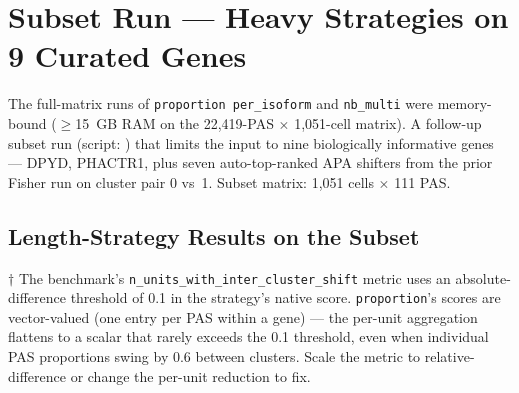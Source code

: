 \documentclass[11pt,a4paper]{article}
\begin{document}
\section{Subset Run --- Heavy Strategies on 9 Curated Genes}
\label{sec:subset_run}

The full-matrix runs of \texttt{proportion per\_isoform} and \texttt{nb\_multi} were
memory-bound ($\geq$15~GB RAM on the 22,419-PAS $\times$ 1,051-cell matrix). A
follow-up subset run (script: ) that limits the input
to nine biologically informative genes --- DPYD, PHACTR1, plus seven
auto-top-ranked APA shifters from the prior Fisher run on cluster pair 0 vs~1.
Subset matrix: 1,051 cells $\times$ 111 PAS.

\subsection{Length-Strategy Results on the Subset}

\begin{table}[htbp]
  \centering
  \caption{Length strategy results on the 9-gene curated subset.}
  \label{tab:subset_length}
\end{table}

$\dagger$ The benchmark's \texttt{n\_units\_with\_inter\_cluster\_shift} metric uses an
absolute-difference threshold of 0.1 in the strategy's native score.
\texttt{proportion}'s scores are vector-valued (one entry per PAS within a gene) ---
the per-unit aggregation flattens to a scalar that rarely exceeds the 0.1 threshold,
even when individual PAS proportions swing by 0.6 between clusters. Scale the metric
to relative-difference or change the per-unit reduction to fix.
\end{document}
